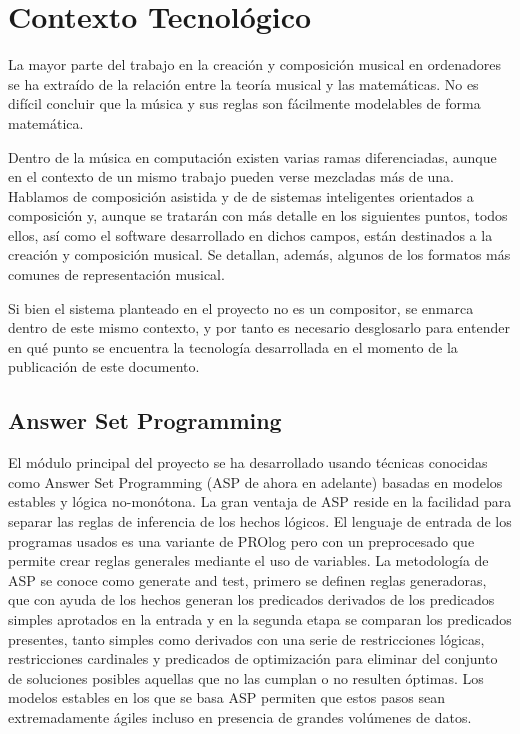 \section{Contexto Tecnológico}
\minitoc
\label{chap:contexto-tecnologico}

La mayor parte del trabajo en la creación y composición musical en ordenadores se ha extraído de la relación entre la teoría musical y las matemáticas. No es difícil concluir que la música y sus reglas son fácilmente modelables de forma matemática. 

Dentro de la música en computación existen varias ramas diferenciadas, aunque en el contexto de un mismo trabajo pueden verse mezcladas más de una. Hablamos de composición asistida y de de sistemas inteligentes orientados a composición y, aunque se tratarán con más detalle en los siguientes puntos, todos ellos, así como el software desarrollado en dichos campos, están destinados a la creación y composición musical. Se detallan, además, algunos de los formatos más comunes de representación musical.

Si bien el sistema planteado en el proyecto no es un compositor, se enmarca dentro de este mismo contexto, y por tanto es necesario desglosarlo para entender en qué punto se encuentra la tecnología desarrollada en el momento de la publicación de este documento.

\subsection{Answer Set Programming}
El módulo principal del proyecto se ha desarrollado usando técnicas conocidas como Answer Set Programming (ASP de ahora en adelante) basadas en modelos estables y lógica no-monótona. La gran ventaja de ASP reside en la facilidad para separar las reglas de inferencia de los hechos lógicos. El lenguaje de entrada de los programas usados es una variante de PROlog pero con un preprocesado que permite crear reglas generales mediante el uso de variables. La metodología de ASP se conoce como generate and test, primero se definen reglas generadoras, que con ayuda de los hechos generan los predicados derivados de los predicados simples aprotados en la entrada y en la segunda etapa se comparan los predicados presentes, tanto simples como derivados con una serie de restricciones lógicas, restricciones cardinales y predicados de optimización para eliminar del conjunto de soluciones posibles aquellas que no las cumplan o no resulten óptimas. Los modelos estables en los que se basa ASP permiten que estos pasos sean extremadamente ágiles incluso en presencia de grandes volúmenes de datos. 

